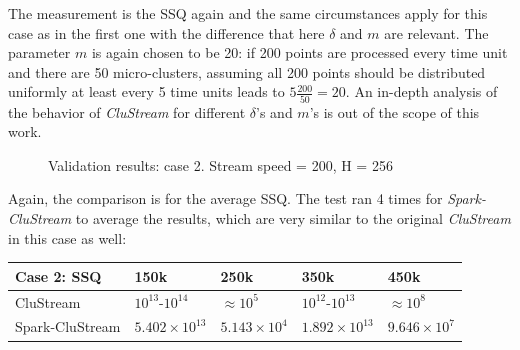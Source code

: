The measurement is the SSQ again and the same circumstances apply for this case as in the first one with the difference that here $\delta$ and $m$ are relevant. The parameter $m$ is again chosen to be 20: if 200 points are processed every time unit and there are 50 micro-clusters, assuming all 200 points should be distributed uniformly at least every 5 time units leads to $5\frac{200}{50}=20$. An in-depth analysis of the behavior of \textit{CluStream} for different $\delta$'s and $m$'s is out of the scope of this work. 


\begin{figure}[h]
\hfill
{}
\hfill
{}
\hfill
\caption{Validation results: case 2. Stream speed = 200, H = 256}
\label{fig:200h256}
\end{figure}

Again, the comparison is for the average SSQ. The test ran 4 times for \textit{Spark-CluStream} to average the results, which are very similar to the original \textit{CluStream} in this case as well:

\begin{center}
\begin{tabular}{|l|l|l|l|l|}\hline
\textbf{Case 2: SSQ} & \textbf{150k} & \textbf{250k} & \textbf{350k} & \textbf{450k}\\\hline
CluStream & $10^{13}$-$10^{14}$ & $\approx 10^{5}$ & $10^{12}$-$10^{13}$ & $\approx 10^{8}$\\\hline
Spark-CluStream & $5.402\times10^{13}$ & $5.143\times10^{4}$ & $1.892\times10^{13}$ & $9.646\times10^7$\\\hline
\end{tabular}
\end{center}



